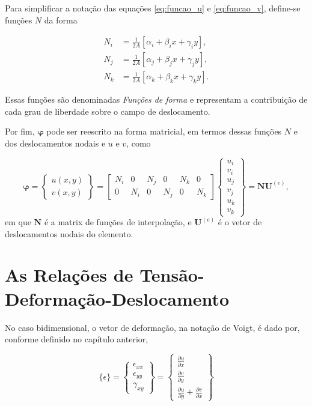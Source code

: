Para simplificar a notação das equações \ref{eq:funcao_u} e \ref{eq:funcao_v}, define-se funções $N$ da forma

\begin{align}
    N_i &= \frac{1}{2A} \left[ \alpha_i + \beta_i x + \gamma_i y \right], \\
    N_j &= \frac{1}{2A} \left[ \alpha_j + \beta_j x + \gamma_j y \right], \\
    N_k &= \frac{1}{2A} \left[ \alpha_k + \beta_k x + \gamma_k y \right].
\end{align}

Essas funções são denominadas \emph{Funções de forma} e representam a contribuição de cada grau de liberdade sobre o campo de deslocamento.

Por fim, $\bm{\varphi}$ pode ser reescrito na forma matricial, em termos dessas funções $N$ e dos deslocamentos nodais e $u$ e $v$, como

\begin{equation}
    \bm{\varphi} = \begin{Bmatrix}
        u(x,y) \\ v(x,y)
    \end{Bmatrix} = \begin{bmatrix}
        N_i & 0 & N_j & 0 & N_k & 0 \\
        0 & N_i & 0 & N_j & 0 & N_k
    \end{bmatrix} \begin{Bmatrix}
        u_i \\ v_i \\ u_j \\ v_j \\ u_k \\ v_k
    \end{Bmatrix} = \bm{N} \bm{U}^{(e)},
\end{equation}
em que $\bm{N}$ é a matrix de funções de interpolação, e $\bm{U}^{(e)}$ é o vetor de deslocamentos nodais do elemento.


\section{As Relações de Tensão-Deformação-Deslocamento}

No caso bidimensional, o vetor de deformação, na notação de Voigt, é dado por, conforme definido no capítulo anterior,

\begin{equation}
    \{\epsilon\} = \begin{Bmatrix}
        \epsilon_{xx} \\ \epsilon_{yy} \\ \gamma_{xy}
    \end{Bmatrix} =
    \begin{Bmatrix}
        \frac{\partial u}{\partial x} \\ \frac{\partial v}{\partial y} \\ \frac{\partial u}{\partial y} + \frac{\partial v}{\partial x}
    \end{Bmatrix}
\end{equation}

